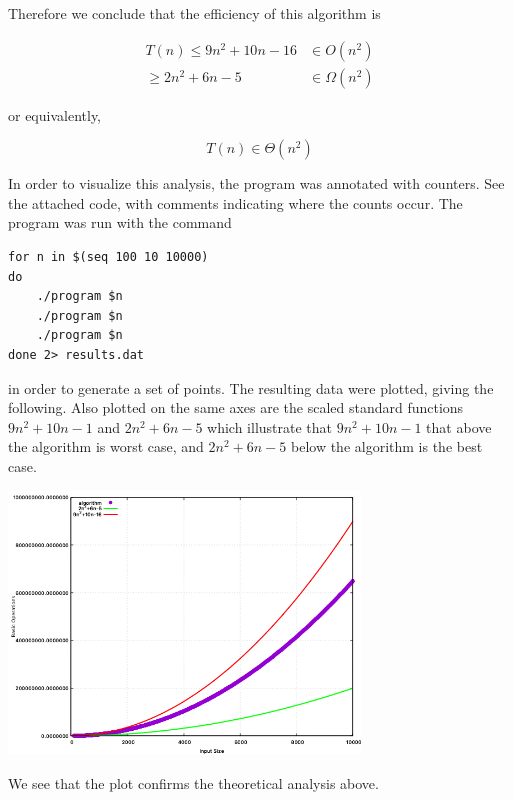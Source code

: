 \documentclass[11pt]{article}
\begin{document}
Therefore we conclude that the efficiency of this algorithm is

\begin{align*}
  T(n) \leq 9n^{2} + 10n - 16 &\in O(n^{2})\\
       \geq 2n^{2} + 6n - 5 &\in \Omega(n^{2})
\end{align*}

or equivalently,

\[
T(n) \in \Theta(n^2)
\]

In order to visualize this analysis, the program was annotated with
counters.  See the attached code, with comments indicating where the
counts occur.  The program was run with the command

\begin{Verbatim}
for n in $(seq 100 10 10000)
do
    ./program $n
    ./program $n
    ./program $n
done 2> results.dat
\end{Verbatim}

in order to generate a set of points.  The resulting data were
plotted, giving the following.  Also plotted on the same axes are the
scaled standard functions $9n^{2} + 10n - 1$ and $2n^{2} + 6n - 5$
which illustrate that $9n^{2} + 10n - 1$ that above the algorithm is
worst case, and $2n^{2} + 6n - 5$ below the algorithm is the best
case.

\begin{center}
  \includegraphics[width=0.7\textwidth]{analysis.png}
\end{center}

We see that the plot confirms the theoretical analysis above.
\end{document}
